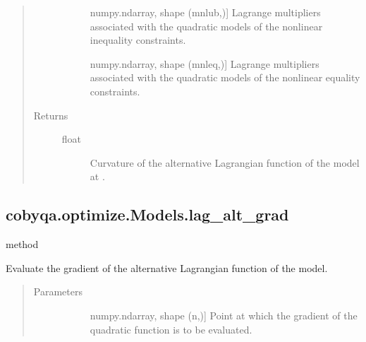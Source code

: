\documentclass[letterpaper,10pt,english]{sphinxmanual}
\begin{document}
\begin{fulllineitems}
\begin{fulllineitems}
\begin{quote}
\begin{description}
\begin{description}
\item[{}] \leavevmode{[}numpy.ndarray, shape (mnlub,){]}
\sphinxAtStartPar
Lagrange multipliers associated with the quadratic models of the
nonlinear inequality constraints.

\item[{}] \leavevmode{[}numpy.ndarray, shape (mnleq,){]}
\sphinxAtStartPar
Lagrange multipliers associated with the quadratic models of the
nonlinear equality constraints.

\end{description}

\item[{Returns}] \leavevmode\begin{description}
\item[{float}] \leavevmode
\sphinxAtStartPar
Curvature of the alternative Lagrangian function of the model at
.

\end{description}

\end{description}\end{quote}

\end{fulllineitems}



\subsection{cobyqa.optimize.Models.lag\_alt\_grad}
\label{\detokenize{refs/generated/cobyqa.optimize.Models.lag_alt_grad:cobyqa-optimize-models-lag-alt-grad}}\label{\detokenize{refs/generated/cobyqa.optimize.Models.lag_alt_grad::doc}}
\sphinxAtStartPar
method

\begin{fulllineitems}
\label{\detokenize{refs/generated/cobyqa.optimize.Models.lag_alt_grad:cobyqa.optimize.Models.lag_alt_grad}}
\sphinxAtStartPar
Evaluate the gradient of the alternative Lagrangian function of the
model.
\begin{quote}\begin{description}
\item[{Parameters}] \leavevmode\begin{description}
\item[{}] \leavevmode{[}numpy.ndarray, shape (n,){]}
\sphinxAtStartPar
Point at which the gradient of the quadratic function is to be
evaluated.


\end{description}
\end{description}
\end{quote}
\end{fulllineitems}
\end{fulllineitems}
\end{document}
